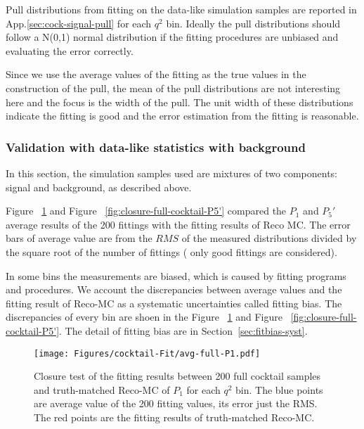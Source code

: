 Pull distributions from fitting on the data-like simulation samples
are reported in App.\ref{sec:cock-signal-pull} for each $q^2$ bin.
Ideally the pull distributions should follow
a N(0,1) normal distribution if the fitting procedures are unbiased
and evaluating the error correctly.

Since we use the average values of the fitting as the true values in
the construction of the pull, the mean of the pull distributions are
not interesting here and the focus is the width of the pull.  The unit
width of these distributions indicate the fitting is good and the
error estimation from the fitting is reasonable.


\subsubsection{Validation with data-like statistics with background}
\label{sec:Cocktail-MC-full}

In this section, the simulation samples used are mixtures of two
components: signal and background, as described above.

Figure ~\ref{fig:closure-full-cocktail-p1} and Figure
~\ref{fig:closure-full-cocktail-P5'} compared the $P_1$ and $P_5'$
average results of the 200 fittings with the fitting results of Reco MC.
The error bars of average value are from  the $RMS$ of
the measured distributions divided by the square root of the number of
fittings ( only good fittings are considered).

In some bins the measurements are biased, which is caused by fitting
programs and procedures. We account
the discrepancies between average values and the fitting result of Reco-MC
as a systematic uncertainties called fitting bias. The discrepancies
of every bin are shoen in the Figure ~\ref{fig:closure-full-cocktail-p1}
and Figure ~\ref{fig:closure-full-cocktail-P5'}. The detail of fitting bias are in Section~\ref{sec:fitbias-syst}.


\begin{figure}[!hbt]
  \centering
  \texttt{[image: Figures/cocktail-Fit/avg-full-P1.pdf]}
  \caption{Closure test of the fitting results between 200 full cocktail
 samples and truth-matched Reco-MC of $P_1$ for each $q^2$ bin. The blue points
are average value of the 200 fitting values, its error just the RMS. The red
points are the fitting results of truth-matched Reco-MC.}
  \label{fig:closure-full-cocktail-p1}
\end{figure}

